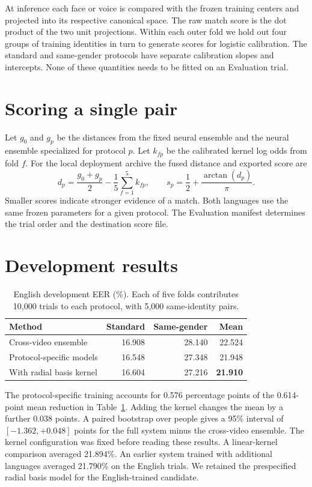 \documentclass[10pt,letterpaper]{article}
\begin{document}
At inference each face or voice is compared with the frozen training
centers and projected into its respective canonical space. The raw
match score is the dot product of the two unit projections. Within each
outer fold we hold out four groups of training identities in turn to
generate scores for logistic calibration. The standard and same-gender
protocols have separate calibration slopes and intercepts. None of these
quantities needs to be fitted on an Evaluation trial.

\section{Scoring a single pair}
Let \(g_0\) and \(g_p\) be the distances from the fixed neural ensemble
and the neural ensemble specialized for protocol \(p\). Let \(k_{fp}\)
be the calibrated kernel log odds from fold \(f\). For the local
deployment archive the fused distance and exported score are
\begin{equation}
 d_p=\frac{g_0+g_p}{2}-\frac{1}{5}\sum_{f=1}^{5} k_{fp},
 \qquad s_p=\frac12+\frac{\arctan(d_p)}{\pi}.
\end{equation}
Smaller scores indicate stronger evidence of a match. Both languages
use the same frozen parameters for a given protocol. The Evaluation
manifest determines the trial order and the destination score file.

\section{Development results}
\begin{table}[!ht]
\centering
\caption{English development EER (\%). Each of five folds contributes
10,000 trials to each protocol, with 5,000 same-identity pairs.}
\label{tab:local}
\smallskip\small\renewcommand{\arraystretch}{1.15}
\begin{tabular}{@{}lrrr@{}}
\hline
Method & Standard & Same-gender & Mean\\ \hline
Cross-video ensemble &16.908&28.140&22.524\\
Protocol-specific models &16.548&27.348&21.948\\
With radial basis kernel &16.604&27.216&\textbf{21.910}\\ \hline
\end{tabular}
\end{table}
The protocol-specific training accounts for 0.576 percentage points
of the 0.614-point mean reduction in Table~\ref{tab:local}. Adding the
kernel changes the mean by a further 0.038 points. A paired bootstrap
over people gives a 95\% interval of \([-1.362,+0.048]\) points for
the full system minus the cross-video ensemble. The kernel configuration
was fixed before reading these results. A linear-kernel comparison
averaged 21.894\%. An earlier system trained with additional languages
averaged 21.790\% on the English trials. We retained the prespecified
radial basis model for the English-trained candidate.
\end{document}
